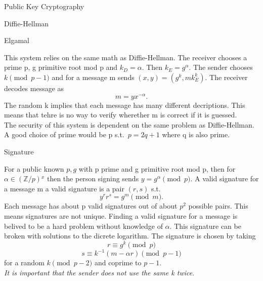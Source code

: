 \documentclass[12pt, letterpaper]{article}
\begin{document}
\begin{section}{Public Key Cryptography}
\begin{subsection}{Diffie-Hellman}
  \end{subsection}

  \begin{subsection}{Elgamal}

    This system relies on the same math as Diffie-Hellman. The receiver chooses
    a prime p, g primitive root mod p and \(k_{D} = \alpha\). Then \(k_{E} =
    g^{\alpha}\). The sender chooses \(k \pmod{p - 1}\) and for a message m
    sends \((x, y) = (g^{k}, mk_{E}^{k})\). The receiver decodes message as
    \[m = yx^{-\alpha}.\] The random k implies that each message has many
    different decriptions. This means that tehre is no way to verify wherether
    m is correct if it is guessed. \\
    The security of this system is dependent on the same problem as
    Diffie-Hellman. \\
    A good choice of prime would be p s.t.\ \(p = 2q + 1\) where q is also
    prime.

    \begin{subsubsection}{Signature}

      For a public known \(p, g\) with p prime and g primitive root mod p, then
      for \(\alpha \in (\mathbb{Z} / p){}^{x}\) then the person signing sends
      \(y = g^{\alpha} \pmod{p}\). A valid signature for a message m a valid
      signature is a pair \((r, s)\) s.t.\ \[y^{r}r^{s} = g^{m} \pmod{m}.\]
      Each message has about p valid signatures out of about \(p^{2}\) possible
      pairs. This means signatures are not unique. Finding a valid signature
      for a message is belived to be a hard problem without knowledge of
      \(\alpha\). This signature can be broken with solutions to the dicrete
      logarithm. The signature is chosen by taking \[r \equiv g^{k} \pmod{p}\]
      \[s \equiv k^{-1}(m - \alpha r) \pmod{p - 1}\] for a random
      \(k \pmod{p - 2}\) and coprime to \(p - 1\). \\
      \textit{It is important that the sender does not use the same k twice}.

    \end{subsubsection}

  \end{subsection}

\end{section}
\end{document}
